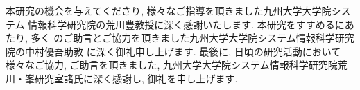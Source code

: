\acknowledgment

本研究の機会を与えてくださり, 様々なご指導を頂きました九州大学大学院システム
情報科学研究院の荒川豊教授に深く感謝いたします. 本研究をすすめるにあたり, 多く
のご助言とご協力を頂きました九州大学大学院システム情報科学研究院の中村優吾助教
に深く御礼申し上げます. 最後に, 日頃の研究活動において様々なご協力, ご助言を頂きました, 九州大学大学院システム情報科学研究院荒川・峯研究室諸氏に深く感謝し,
御礼を申し上げます.
